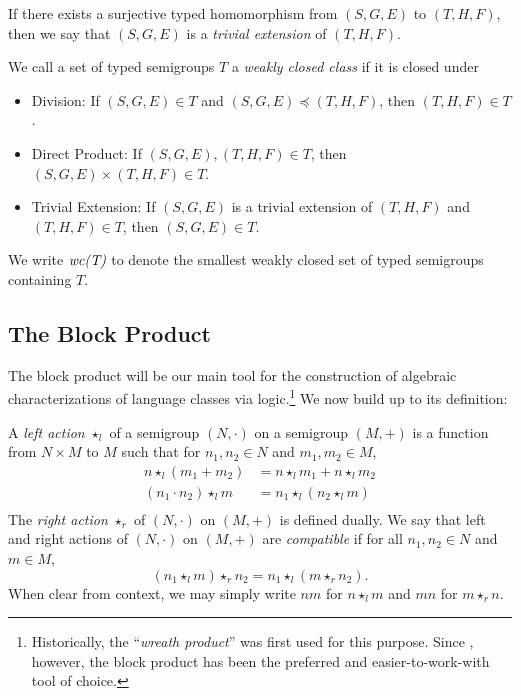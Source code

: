 \documentclass[a4paper,UKenglish,cleveref, autoref, thm-restate, anonymous]{lipics-v2021}
\begin{document}
\begin{definition}
    If there exists a surjective typed homomorphism from $(S, G, E)$ to $(T, H, F)$, then we say that $(S, G, E)$ is a \emph{trivial extension} of $(T, H, F)$.
\end{definition}


\begin{definition}
    We call a set of typed semigroups $T$ a \emph{weakly closed class} if it is closed under
    \begin{itemize}
        \item Division: If $(S, G, E) \in T$ and $(S, G, E) \preceq (T, H, F)$, then $(T, H, F) \in T$.
        \item Direct Product: If $(S, G, E), (T, H, F) \in T$, then $(S, G, E) \times (T, H, F) \in T$.
        \item Trivial Extension: If $(S, G, E)$ is a trivial extension of $(T, H, F)$ and $(T, H, F) \in T$, then $(S, G, E) \in T$.
    \end{itemize}
    We write $\emph{wc(T)}$ to denote the smallest weakly closed set of typed semigroups containing $T$.
\end{definition}


\subsection{The Block Product}
The block product will be our main tool for the construction of algebraic characterizations of language classes via logic.\footnote{Historically, the ``\emph{wreath product}'' was first used for this purpose. Since \cite{rhodes1989kernel}, however, the block product has been the preferred and easier-to-work-with tool of choice.} We now build up to its definition:

\begin{definition}
    A \emph{left action} $\star_l$ of a semigroup $(N, \cdot)$ on a semigroup $(M, +)$ is a function from $N \times M$ to $M$ such that for $n_1,n_2 \in N$ and $m_1,m_2 \in M$, \begin{align*}
        n \star_l (m_1 + m_2) &= n \star_l m_1 + n \star_l m_2\\
        (n_1 \cdot n_2) \star_l m &= n_1 \star_l (n_2 \star_l m)\\
    \end{align*}
    The \emph{right action} $\star_r$ of $(N, \cdot)$ on $(M, +)$ is defined dually. We say that left and right actions of $(N, \cdot)$ on $(M,+)$ are \emph{compatible} if for all $n_1,n_2 \in N$ and $m \in M$, \[
        (n_1 \star_l m) \star_r n_2 = n_1 \star_l (m \star_r n_2).
    \] When clear from context, we may simply write $nm$ for $n \star_l m$ and $mn$ for $m \star_r n$.
\end{definition}
\end{document}
